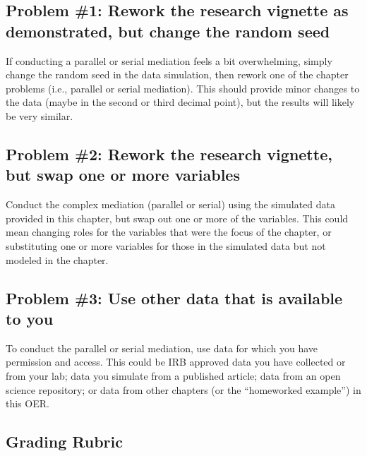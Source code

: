 \documentclass[
  11pt,
]{book}
\begin{document}
\hypertarget{problem-1-rework-the-research-vignette-as-demonstrated-but-change-the-random-seed-1}{%
\subsection{Problem \#1: Rework the research vignette as demonstrated, but change the random seed}\label{problem-1-rework-the-research-vignette-as-demonstrated-but-change-the-random-seed-1}}

If conducting a parallel or serial mediation feels a bit overwhelming, simply change the random seed in the data simulation, then rework one of the chapter problems (i.e., parallel or serial mediation). This should provide minor changes to the data (maybe in the second or third decimal point), but the results will likely be very similar.

\hypertarget{problem-2-rework-the-research-vignette-but-swap-one-or-more-variables-1}{%
\subsection{Problem \#2: Rework the research vignette, but swap one or more variables}\label{problem-2-rework-the-research-vignette-but-swap-one-or-more-variables-1}}

Conduct the complex mediation (parallel or serial) using the simulated data provided in this chapter, but swap out one or more of the variables. This could mean changing roles for the variables that were the focus of the chapter, or substituting one or more variables for those in the simulated data but not modeled in the chapter.

\hypertarget{problem-3-use-other-data-that-is-available-to-you-1}{%
\subsection{Problem \#3: Use other data that is available to you}\label{problem-3-use-other-data-that-is-available-to-you-1}}

To conduct the parallel or serial mediation, use data for which you have permission and access. This could be IRB approved data you have collected or from your lab; data you simulate from a published article; data from an open science repository; or data from other chapters (or the ``homeworked example'') in this OER.

\hypertarget{grading-rubric-5}{%
\subsection{Grading Rubric}\label{grading-rubric-5}}
\end{document}
